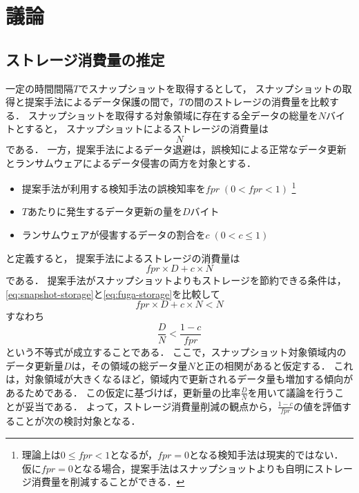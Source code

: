 \chapter{議論}
\label{chap:discussion}

\section{ストレージ消費量の推定}
一定の時間間隔$T$でスナップショットを取得するとして，
スナップショットの取得と提案手法によるデータ保護の間で，$T$の間のストレージの消費量を比較する．
スナップショットを取得する対象領域に存在する全データの総量を$N$バイトとすると，
スナップショットによるストレージの消費量は
\begin{equation}
  \label{eq:snapshot-storage}
  N
\end{equation}
である．
一方，提案手法によるデータ退避は，誤検知による正常なデータ更新とランサムウェアによるデータ侵害の両方を対象とする．
\begin{itemize}
  \item 提案手法が利用する検知手法の誤検知率を$fpr \;(0 < fpr < 1)$ \footnote{理論上は$0 \le fpr < 1$となるが，$fpr = 0$となる検知手法は現実的ではない．
          仮に$fpr = 0$となる場合，提案手法はスナップショットよりも自明にストレージ消費量を削減することができる．}
  \item $T$あたりに発生するデータ更新の量を$D$バイト
  \item ランサムウェアが侵害するデータの割合を$c \; (0 < c \le 1)$
\end{itemize}
と定義すると，
提案手法によるストレージの消費量は
\begin{equation}
  \label{eq:fuga-storage}
  fpr \times D + c \times N
\end{equation}
である．
提案手法がスナップショットよりもストレージを節約できる条件は，\eqref{eq:snapshot-storage}と\eqref{eq:fuga-storage}を比較して
\begin{equation}
  fpr \times D + c \times N < N
\end{equation}
すなわち
\begin{equation}
  \label{eq:storage-compare}
  \frac{D}{N} < \frac{1-c}{fpr}
\end{equation}
という不等式が成立することである．
ここで，スナップショット対象領域内のデータ更新量$D$は，その領域の総データ量$N$と正の相関があると仮定する．
これは，対象領域が大きくなるほど，領域内で更新されるデータ量も増加する傾向があるためである．
この仮定に基づけば，更新量の比率$\frac{D}{N}$を用いて議論を行うことが妥当である．
よって，ストレージ消費量削減の観点から，$\frac{1-c}{fpr}$の値を評価することが次の検討対象となる．


